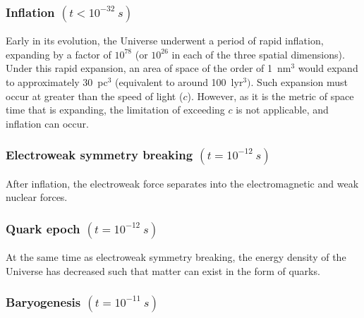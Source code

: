 \documentclass[]{book}
\begin{document}
\hypertarget{inflation-t-10-32s}{%
\subsubsection*{\texorpdfstring{Inflation \((t < 10^{-32}~s)\)}{Inflation (t \textless{} 10\^{}\{-32\}\textasciitilde{}s)}}\label{inflation-t-10-32s}}

Early in its evolution, the Universe underwent a period of rapid
inflation, expanding by a factor of \(10^{78}\) (or \(10^{26}\) in each of
the three spatial dimensions). Under this rapid expansion, an area of
space of the order of 1~nm\(^{3}\) would expand to approximately
30~pc\(^{3}\) (equivalent to around 100~lyr\(^{3})\). Such expansion must
occur at greater than the speed of light (\(c\)). However, as it is the
metric of space time that is expanding, the limitation of exceeding \(c\)
is not applicable, and inflation can occur.

\hypertarget{electroweak-symmetry-breaking-t-10-12s}{%
\subsubsection*{\texorpdfstring{Electroweak symmetry breaking \((t = 10^{-12}~s)\)}{Electroweak symmetry breaking (t = 10\^{}\{-12\}\textasciitilde{}s)}}\label{electroweak-symmetry-breaking-t-10-12s}}

After inflation, the electroweak force separates into the
electromagnetic and weak nuclear forces.

\hypertarget{quark-epoch-t-10-12s}{%
\subsubsection*{\texorpdfstring{Quark epoch \((t = 10^{-12}~s)\)}{Quark epoch (t = 10\^{}\{-12\}\textasciitilde{}s)}}\label{quark-epoch-t-10-12s}}

At the same time as electroweak symmetry breaking, the energy density of
the Universe has decreased such that matter can exist in the form of
quarks.

\hypertarget{baryogenesis-t-10-11s}{%
\subsubsection*{\texorpdfstring{Baryogenesis \((t = 10^{-11}~s)\)}{Baryogenesis (t = 10\^{}\{-11\}\textasciitilde{}s)}}\label{baryogenesis-t-10-11s}}
\end{document}

